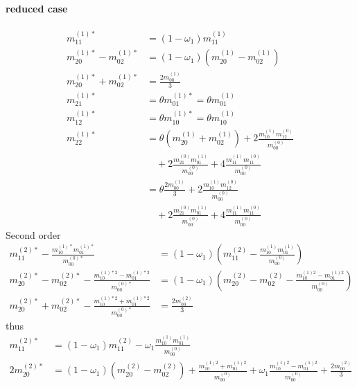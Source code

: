 \documentclass{article}
\begin{document}
  \paragraph{reduced case}
  \begin{align}
      m_{11}^{(1)*} & = (1-\omega_1) m_{11}^{(1)}  \tag{R1}
      \\
      m_{20}^{(1)*} - m_{02}^{(1)*}
        & = (1-\omega_1) (m_{20}^{(1)} - m_{02}^{(1)})  \tag{R2}
        \\
      m_{20}^{(1)*} + m_{02}^{(1)*}
        & =  \frac{2 m_{00}^{(1)}}{3}  \tag{R3}
        \\
      m_{21}^{(1)*} & = \theta m_{01}^{(1)*} = \theta m_{01}^{(1)}  \tag{R4}
      \\
      m_{12}^{(1)*} & = \theta m_{10}^{(1)*} = \theta m_{10}^{(1)}  \tag{R5}
      \\
      m_{22}^{(1)*} & =  \theta (m_{20}^{(1)} + m_{02}^{(1)}) \tag{R6}
        + 2\frac{ m_{10}^{(1)} m_{12}^{(0)} }{m_{00}^{(0)}}
        \\\nonumber&\quad
        + 2\frac{ m_{21}^{(0)} m_{01}^{(1)} }{m_{00}^{(0)}}
        + 4\frac{ m_{11}^{(1)} m_{11}^{(0)} }{m_{00}^{(0)}}
        \\\nonumber&= \theta \frac{2 m_{00}^{(1)}}{3} + 2\frac{ m_{10}^{(1)} m_{12}^{(0)} }{m_{00}^{(0)}}
        \\\nonumber&\quad
        + 2\frac{ m_{21}^{(0)} m_{01}^{(1)} }{m_{00}^{(0)}}
        + 4\frac{ m_{11}^{(1)} m_{11}^{(0)} }{m_{00}^{(0)}}
  \end{align}
Second order
  \begin{align}
      m_{11}^{(2)*} - \frac{ m_{10}^{(1)*}m_{01}^{(1)*}}{m_{00}^{(0)*}} & = (1-\omega_1)\left(m_{11}^{(2)} - \frac{ m_{10}^{(1)}m_{01}^{(1)}}{m_{00}^{(0)}}\right)  \tag{R7}
      \\
      m_{20}^{(2)*}-m_{02}^{(2)*} - \frac{ m_{10}^{(1)*2} - m_{01}^{(1)*2}}{m_{00}^{(0)*}}
      & = (1-\omega_1) \left(m_{20}^{(2)}-m_{02}^{(2)} - \frac{ m_{10}^{(1)2} - m_{01}^{(1)2}}{m_{00}^{(0)}}\right)  \tag{R8}
      \\
      m_{20}^{(2)*}+m_{02}^{(2)*} - \frac{ m_{10}^{(1)*2} + m_{01}^{(1)*2}}{m_{00}^{(0)*}} & = \frac{2 m_{00}^{(2)}}{3} \tag{R9}
  \end{align}
  thus
  \begin{align}
      m_{11}^{(2)*} & = (1-\omega_1)m_{11}^{(2)} - \omega_1\frac{ m_{10}^{(1)}m_{01}^{(1)}}{m_{00}^{(0)}} \tag{R10}
      \\
      2m_{20}^{(2)*} & = (1-\omega_1) \left(m_{20}^{(2)}-m_{02}^{(2)}\right)
      + \frac{ m_{10}^{(1)2} + m_{01}^{(1)2}}{m_{00}^{(0)}} + \omega_1 \frac{ m_{10}^{(1)2} - m_{01}^{(1)2}}{m_{00}^{(0)}}
      + \frac{2 m_{00}^{(2)}}{3}  \tag{R11}
  \end{align}
\end{document}
